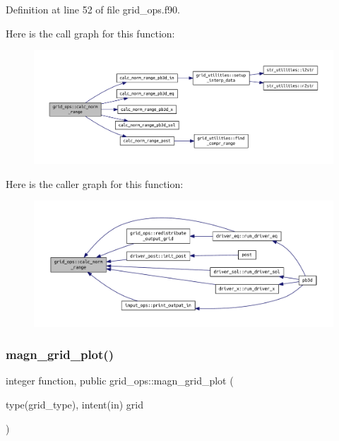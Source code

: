 Definition at line 52 of file grid\+\_\+ops.\+f90.

Here is the call graph for this function\+:
\nopagebreak
\begin{figure}[H]
\begin{center}
\leavevmode
\includegraphics[width=350pt]{namespacegrid__ops_a596695cab6971ec6b9d32d13a50708b6_cgraph}
\end{center}
\end{figure}
Here is the caller graph for this function\+:
\nopagebreak
\begin{figure}[H]
\begin{center}
\leavevmode
\includegraphics[width=350pt]{namespacegrid__ops_a596695cab6971ec6b9d32d13a50708b6_icgraph}
\end{center}
\end{figure}
\mbox{\label{namespacegrid__ops_addd76b7b3be0b51e0863ae0cdfef41e6}} 
\subsubsection{\texorpdfstring{magn\+\_\+grid\+\_\+plot()}{magn\_grid\_plot()}}
{\footnotesize\ttfamily integer function, public grid\+\_\+ops\+::magn\+\_\+grid\+\_\+plot (\begin{DoxyParamCaption}\item[{type(grid\+\_\+type), intent(in)}]{grid }\end{DoxyParamCaption})}



